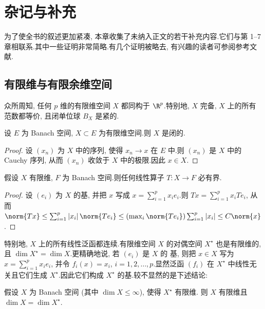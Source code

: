 
\chapter{杂记与补充}
\label{chap:11}

为了使全书的叙述更加紧凑, 本章收集了未纳入正文的若干补充内容.它们与第 1--7
章相联系.其中一些证明非常简略.有几个证明被略去, 有兴趣的读者可参阅参考文献.

\section{有限维与有限余维空间}
\label{sec:11.1}

众所周知, 任何 $p$ 维的有限维空间 $X$ 都同构于 $\R^p$.特别地, $X$ 完备,
$X$ 上的所有范数都等价, 且闭单位球 $B_X$ 是紧的.

\begin{proposition}
\label{prop:11.1}
设 $E$ 为 Banach 空间, $X\subset E$ 为有限维空间.则 $X$ 是闭的.
\end{proposition}

\begin{proof}
设 $(x_n)$ 为 $X$ 中的序列, 使得 $x_n\to x$ 在 $E$ 中.则 $(x_n)$ 是 $X$
中的 Cauchy 序列, 从而 $(x_n)$ 收敛于 $X$ 中的极限.因此 $x\in X$.
\end{proof}

\begin{proposition}
\label{prop:11.2}
假设 $X$ 有限维, $F$ 为 Banach 空间.则任何线性算子 $T:X\to F$ 必有界.
\end{proposition}

\begin{proof}
设 $(e_i)$ 为 $X$ 的基, 并把 $x$ 写成 $x=\sum_{i=1}^px_ie_i$.则
$Tx=\sum_{i=1}^px_iTe_i$, 从而
$\norm{Tx}\le\sum_{i=1}^p\abs{x_i}\norm{Te_i}\le(\max_i\norm{Te_i})\sum_{i=1}^p\abs{x_i}
\le C\norm{x}$.
\end{proof}

特别地, $X$ 上的所有线性泛函都连续.有限维空间 $X$ 的对偶空间 $X^\star$
也是有限维的, 且 $\dim X^\star=\dim X$.更精确地说, 若 $(e_i)$ 是 $X$ 的
基, 则把 $x\in X$ 写为 $x=\sum_{i=1}^px_ie_i$, 并令 $f_i(x)=x_i$,
$i=1,2,\dots,p$.显然泛函 $(f_i)$ 在 $X^\star$ 中线性无关且它们生成
$X^\star$.因此它们构成 $X^\star$ 的基.较不显然的是下述结论:

\begin{proposition}
\label{prop:11.3}
假设 $X$ 为 Banach 空间 (其中 $\dim X\le\infty$), 使得 $X^\star$ 有限维.
则 $X$ 有限维且 $\dim X=\dim X^\star$.
\end{proposition}

